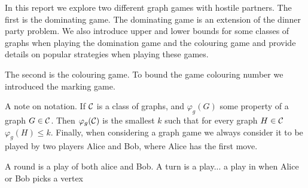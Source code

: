 In this report %
we explore two different graph games with hostile partners. The first is the dominating game. The dominating game is an extension of the dinner party problem.  We also introduce upper and lower bounds for some classes of graphs when playing the domination game and the colouring game and provide details on popular strategies when playing these games.

The second is the colouring game. To bound the game colouring number we introduced the marking game. 




  
    
A note on notation. If $\mathcal{C}$ is a class of graphs, and $\varphi_g(G)$ some property of a graph $G \in \mathcal{C}$. Then $\varphi_g(\mathcal{C})$ is the smallest $k$ such that for every graph $H\in\mathcal{C}$ $\varphi_g(H)\leq k$. Finally, when considering a graph game we always consider it to be played by two players Alice and Bob, where Alice has the first move.  

A round is a play of both alice and Bob. A turn is a play... a play in when Alice or Bob picks a vertex %


    
    
    
    
    
    
    
    
    
    
    
    
    
    
    
    
    
    
    
    
    